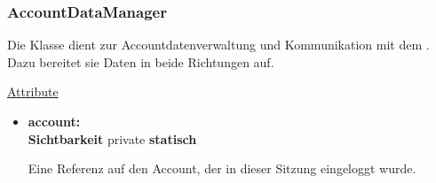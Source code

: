 \subsubsection{AccountDataManager}\label{AccountDataManager}
Die Klasse dient zur Accountdatenverwaltung und Kommunikation mit dem . Dazu bereitet sie Daten in beide Richtungen auf. \newline

\underline{Attribute}
\begin{itemize}
\itemsep0pt

\item \textbf{account: } \hfill\\ 
\textbf{Sichtbarkeit} private \newline
\textbf{statisch}

Eine Referenz auf den Account, der in dieser Sitzung eingeloggt wurde.

\end{itemize}

